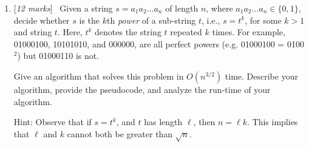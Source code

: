\documentclass[11pt]{article}
\newcommand{\Q}[1]{\medskip\item {[{\em #1 marks\/}]}\ }
\newif\ifsol
\newcommand{\solution}[1]{{\ifsol \color{red} {#1} \fi}}
\begin{document}
\begin{enumerate}
\begin{enumerate}
\solution{
    line 2 execuates $m$ times, line 4 execuates $n$ times, line 8 execuates exactly $n$ time since $A$ has 
    size $n$.\\
    Putiing all together,
    \begin{align*}
        T(n) & = m + n + 1 + n\\
        & \in \Theta (\max(m, n))
    \end{align*}
}

\end{enumerate}

\Q{12}
Given a string $s = a_1 a_2 ... a_n$ of length $n$, where $a_1 a_2 ... a_n \in \{0, 1\}$, decide whether $s$ is the $k$th {\em power} of a sub-string $t$, i.e., $s=t^k$, for some $k > 1$ and string $t$. Here, $t^k$ denotes the string $t$ repeated $k$ times. For example, 01000100, 10101010, and 000000, are all perfect powers (e.g. 01000100 = 0100$^2$) but  01000110 is not. 

Give an algorithm that solves this problem in $O(n^{3/2})$ time. Describe your algorithm, provide the pseudocode, and analyze the run-time of your algorithm.

Hint: Observe that if $s=t^k$, and $t$ has length $\ell$, then $n = \ell k$. This implies that $\ell$ and $k$ cannot both be greater than $\sqrt{n}$.


\end{enumerate}
\end{document}

